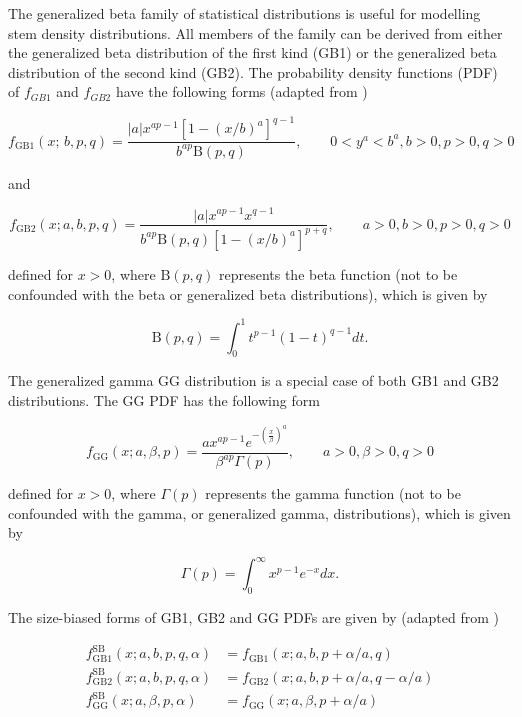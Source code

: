 The generalized beta family of statistical distributions is useful for
modelling stem density distributions. %
All members of the family can be derived from either the generalized beta distribution of the first kind (GB1) or the generalized beta distribution of the second kind (GB2).
The probability density functions (PDF) of $f_{GB1}$ and $f_{GB2}$ have the following forms (adapted from \citealp{ducey2015sizebiased})

\begin{equation}
f_{\text{GB1}}(x; \, b, p, q) = \frac{|a|x^{ap-1}\left[1 - (x/b)^a\right]^{q-1}}{b^{ap}\text{B}(p, q)}, \qquad 0 < y^a < b^a, b > 0, p > 0, q > 0
\end{equation}

and 

\begin{equation}
f_{\text{GB2}} (x; a, b, p, q) = \frac{|a|x^{ap-1}x^{q-1}}{b^{ap}\text{B}(p, q)\left[1 - (x/b)^a\right]^{p+q}}, \qquad a > 0, b > 0, p > 0, q > 0
\end{equation}

defined for $x > 0$, where $\text{B}(p, q)$ represents the beta function (not to be confounded with the beta or generalized beta distributions), which is given by

\begin{equation}
\text{B}(p, q) = \int_0^1 t^{p-1} (1 - t)^{q-1} dt.
\end{equation}

The generalized gamma GG distribution is a special case of both GB1 and GB2 distributions. The GG PDF has the following form

\begin{equation}
f_{\text{GG}}(x; a, \beta, p) = \frac{ax^{ap-1}e^{-\left(\frac{x}{\beta}\right)^a}}{\beta^{ap}\Gamma(p)}, \qquad a > 0, \beta > 0, q > 0
\end{equation}

defined for $x > 0$, where $\Gamma(p)$ represents the gamma function (not to be confounded with the gamma, or generalized gamma, distributions), which is given by

\begin{equation}
\Gamma(p) = \int_0^\infty x^{p-1}e^{-x} dx.
\end{equation}

The size-biased forms of GB1, GB2 and GG PDFs are given by (adapted from \citealp{ducey2015sizebiased})

\begin{align}
f^{\text{SB}}_{\text{GB1}}(x; a, b, p, q, \alpha) &= f_{\text{GB1}}(x; a, b, p + \alpha/a, q)\\
f^{\text{SB}}_{\text{GB2}}(x; a, b, p, q, \alpha) &= f_{\text{GB2}}(x; a, b, p + \alpha/a, q - \alpha/a)\\
f^{\text{SB}}_{\text{GG}}(x; a, \beta, p, \alpha) &= f_{\text{GG}}(x; a, \beta, p + \alpha/a)
\end{align}

